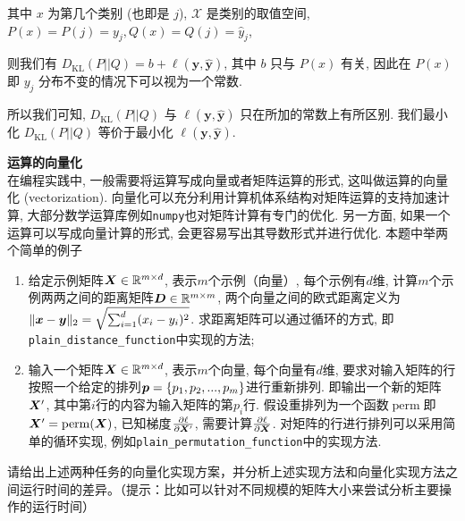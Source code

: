 \documentclass[answers]{exam}  %
\begin{document}
\begin{questions}
\begin{solution}
\begin{enumerate}
            其中 $x$ 为第几个类别 (也即是 $j$), $\mathcal{X}$ 是类别的取值空间, $P(x) = P(j) = y_j, Q(x) = Q(j) = \hat{y}_j$,

            则我们有 $D_{\mathrm{KL}}(P || Q) = b + \ell(\bm{y}, \hat{\bm{y}})$, 其中 $b$ 只与 $P(x)$ 有关, 因此在 $P(x)$ 即 $y_j$ 分布不变的情况下可以视为一个常数.

            所以我们可知, $D_{\mathrm{KL}}(P || Q)$ 与 $\ell(\bm{y}, \hat{\bm{y}})$ 只在所加的常数上有所区别. 我们最小化 $D_{\mathrm{KL}}(P || Q)$ 等价于最小化 $\ell(\bm{y}, \hat{\bm{y}})$.
    \end{enumerate}
  \end{solution}

  \question [20] \textbf{运算的向量化} \\
  在编程实践中, 一般需要将运算写成向量或者矩阵运算的形式, 这叫做运算的向量化 (vectorization).
  向量化可以充分利用计算机体系结构对矩阵运算的支持加速计算,
  大部分数学运算库例如\lstinline{numpy}也对矩阵计算有专门的优化.
  另一方面, 如果一个运算可以写成向量计算的形式, 会更容易写出其导数形式并进行优化.
  本题中举两个简单的例子
  \begin{enumerate}
    \item 给定示例矩阵$\boldsymbol{X} \in \mathbb{R}^{m\times d}$, 表示$m$个示例（向量）, 每个示例有$d$维,
          计算$m$个示例两两之间的距离矩阵$\boldsymbol{D} \in \mathbb{R}^{m\times m}$,
          两个向量之间的欧式距离定义为$\|{\boldsymbol{x}} - \boldsymbol{y}\|_2=\sqrt{\sum_{i=1}^{d} (x_i - y_i)^2}$.
          求距离矩阵可以通过循环的方式, 即\lstinline{plain_distance_function}中实现的方法;
          
    \item 输入一个矩阵$\boldsymbol{X} \in \mathbb{R}^{m\times d}$, 表示$m$个向量, 每个向量有$d$维,
          要求对输入矩阵的行按照一个给定的排列$\boldsymbol{p}=\{p_{1}, p_{2}, ..., p_m\}$进行重新排列.
          即输出一个新的矩阵$\boldsymbol{X}^\prime$, 其中第$i$行的内容为输入矩阵的第$p_{i}$行.
          假设重排列为一个函数$\operatorname{perm}$即$\boldsymbol{X}^\prime = \operatorname{perm}(\boldsymbol{X})$, 已知梯度$\frac{\partial \ell}{\partial \boldsymbol{X}^\prime}$,
          需要计算$\frac{\partial \ell}{\partial \boldsymbol{X}}$. 对矩阵的行进行排列可以采用简单的循环实现, 例如\lstinline{plain_permutation_function}中的实现方法.
          
  \end{enumerate}
  请给出上述两种任务的向量化实现方案，并分析上述实现方法和向量化实现方法之间运行时间的差异。（提示：比如可以针对不同规模的矩阵大小来尝试分析主要操作的运行时间）


\end{questions}
\end{document}
